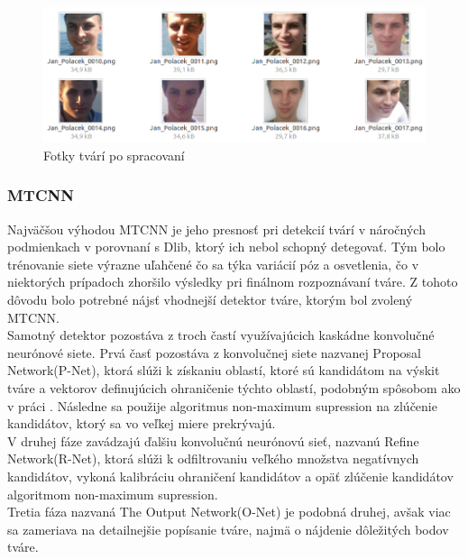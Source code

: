 \begin{figure}[H]
	\centering
	\includegraphics[width=1\linewidth]{img/dlib_aligned}
	\caption{Fotky tvárí po spracovaní}
	\label{fig:dlib_aligned}
\end{figure}


\subsubsection{MTCNN}
Najväčšou výhodou MTCNN je jeho presnosť pri detekcií tvárí v náročných podmienkach v porovnaní s Dlib, ktorý ich nebol schopný detegovať\cite{davidsan26}.
Tým bolo trénovanie siete výrazne uľahčené čo sa týka variácií póz a osvetlenia, čo v niektorých prípadoch zhoršilo výsledky pri finálnom rozpoznávaní tváre.
Z tohoto dôvodu bolo potrebné nájsť vhodnejší detektor tváre, ktorým bol zvolený MTCNN.\\

\indent Samotný detektor pozostáva z troch častí využívajúcich kaskádne konvolučné neurónové siete.
Prvá časť pozostáva z konvolučnej siete nazvanej Proposal Network(P-Net), ktorá slúži k získaniu  oblastí, ktoré sú kandidátom na výskit tváre a vektorov definujúcich ohraničenie týchto oblastí, podobným spôsobom ako v práci \cite{farfade2015multi}.
Následne sa použije algoritmus non-maximum supression na zlúčenie kandidátov, ktorý sa vo veľkej miere prekrývajú. \cite{mtcnn} \\

\indent V druhej fáze zavádzajú ďalšiu konvolučnú neurónovú sieť, nazvanú Refine Network(R-Net),
ktorá slúži k odfiltrovaniu veľkého množstva negatívnych kandidátov, vykoná kalibráciu ohraničení kandidátov a opäť zlúčenie kandidátov algoritmom non-maximum supression. \cite{mtcnn} \\

\indent Tretia fáza nazvaná The Output Network(O-Net) je podobná druhej, avšak viac sa zameriava na detailnejšie popísanie tváre, najmä o nájdenie dôležitých bodov tváre.\cite{mtcnn} \\

